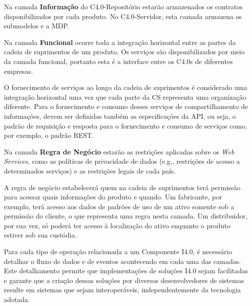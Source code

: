 Na camada \textbf{Informação}  do C4.0-Repositório estarão armazenados os contratos disponibilizados por cada produto. No C4.0-Servidor, esta camada armazena os submodelos e a MDP.

Na camada \textbf{Funcional} ocorre toda a integração horizontal entre as partes da cadeia de suprimentos de um produto. Os serviços são disponibilizados por meio da camada funcional, portanto esta é a interface entre os C4.0s de diferentes empresas.

O fornecimento de serviços ao longo da cadeia de suprimentos é considerado uma integração horizontal uma vez que cada parte da CS representa uma organização diferente. Para o fornecimento e consumo desses serviços de compartilhamento de informações, devem ser definidas também as especificações da API, ou seja, o padrão de requisição e resposta para o fornecimento e consumo de serviços como, por exemplo, o padrão REST.

Na camada \textbf{Regra de Negócio} estarão as restrições aplicadas sobre os \textit{Web Services}, como as políticas de privacidade de dados (e.g., restrições de acesso a determinados serviços) e as restrições legais de cada país.

A regra de negócio estabelecerá quem na cadeia de suprimentos terá permissão para acessar quais informações do produto e quando. Um fabricante, por exemplo, terá acesso aos dados de padrões de uso de um ativo somente sob a permissão do cliente, o que representa uma regra nesta camada. Um distribuidor, por sua vez, só poderá ter acesso à localização do ativo enquanto o produto estiver sob sua custódia.


Para cada tipo de operação relacionada a um Componente I4.0, é necessário detalhar o fluxo de dados e de eventos acontecendo em cada uma das camadas. Este detalhamento permite que implementações de soluções I4.0 sejam facilitadas e garante que a criação dessas soluções por diversos desenvolvedores de sistemas resulte em sistemas que sejam interoperáveis, independentemente da tecnologia adotada.


